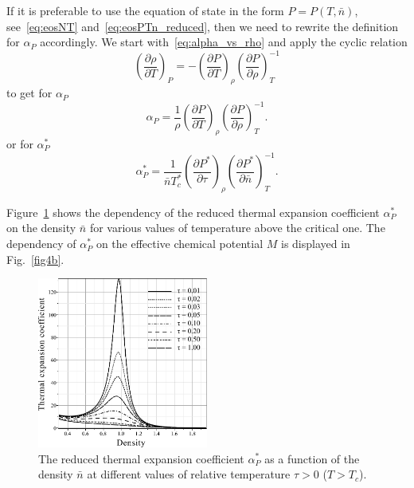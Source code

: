 If it is preferable to use the equation of state in the form $P=P(T, \bar{n})$, see~\eqref{eq:eosNT} and~\eqref{eq:eosPTn_reduced}, then we need to rewrite the definition for $\alpha_P$ accordingly. We start with~\eqref{eq:alpha_vs_rho} and apply the cyclic relation
\begin{equation}
	\left(\frac{\partial \rho}{\partial T}\right)_P = - \left(\frac{\partial P}{\partial T}\right)_{\rho} \left(\frac{\partial P}{\partial \rho}\right)^{-1}_T
\end{equation}
to get for $\alpha_P$
\begin{equation}
	\alpha_P = \frac{1}{\rho} \left(\frac{\partial P}{\partial T}\right)_{\rho} \left(\frac{\partial P}{\partial \rho}\right)^{-1}_T.
\end{equation}
or for $\alpha^*_P$
\begin{equation}
	\alpha^*_P = \frac{1}{\bar{n} T^*_c} \left(\frac{\partial P^*}{\partial \tau}\right)_{\rho} \left(\frac{\partial P^*}{\partial \bar{n}}\right)^{-1}_T.
\end{equation}

Figure~\ref{fig4a} shows the dependency of the reduced thermal expansion coefficient $\alpha^*_P$ on the density $\bar{n}$ for various values of temperature above the critical one. The dependency of $\alpha^*_P$ on the effective chemical potential $M$ is displayed in Fig.~\ref{fig4b}.

\begin{figure}[h!]
	\centering \includegraphics[width=0.5\textwidth]{f4a.pdf}
	\vskip-3mm\caption{The reduced thermal expansion coefficient $\alpha^*_P$ as a function of the density $\bar n$ at different values of relative temperature $\tau > 0$ ($T > T_c$). 
	}\label{fig4a}
\end{figure}

